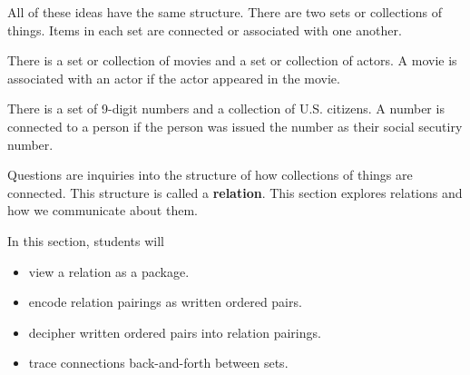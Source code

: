 \documentclass{ximera}
\begin{document}
All of these ideas have the same structure.  There are two sets or collections of things.  Items in each set are connected or associated with one another.



\begin{example}
\item There is a set or collection of movies and a set or collection of actors.  A movie is associated with an actor if the actor appeared in the movie.
\end{example}

\begin{example}
\item There is a set of 9-digit numbers and a collection of U.S. citizens.  A number is connected to a person if the person was issued the number as their social secutiry number.
\end{example}


Questions are inquiries into the structure of how collections of things are connected. This structure is called a \textbf{relation}. This section explores relations and how we communicate about them.











\begin{sectionOutcomes}
In this section, students will 

\begin{itemize}
\item view a relation as a package.
\item encode relation pairings as written ordered pairs.
\item decipher written ordered pairs into relation pairings.
\item trace connections back-and-forth between sets.
\end{itemize}
\end{sectionOutcomes}
\end{document}
